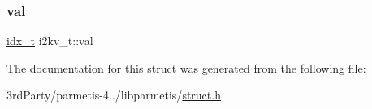 \mbox{\label{structi2kv__t_a713071e870631537fdc2e95b01c00176}} 
\subsubsection{\texorpdfstring{val}{val}}
{\footnotesize\ttfamily \hyperlink{3rd_party_2parmetis-4_80_83_2metis_2include_2metis_8h_aaa5262be3e700770163401acb0150f52}{idx\+\_\+t} i2kv\+\_\+t\+::val}



The documentation for this struct was generated from the following file\+:\begin{DoxyCompactItemize}
\item 
3rd\+Party/parmetis-\/4../libparmetis/\hyperlink{libparmetis_2struct_8h}{struct.\+h}\end{DoxyCompactItemize}
